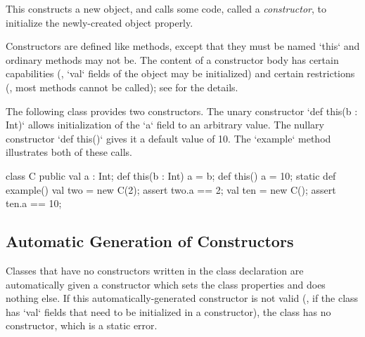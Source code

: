 This constructs a new object, and calls some code, called a {\em constructor},
to initialize the newly-created object properly.

Constructors are defined like methods, except that they must be named \xcd`this`
and ordinary methods may not be.    The content of a constructor body has
certain capabilities (\eg, \xcd`val` fields of the object may be initialized)
and certain restrictions (\eg, most methods cannot be called); see
 for the details.

\begin{ex}

The following class provides two constructors.  The unary constructor 
\xcd`def this(b : Int)` allows initialization of the \xcd`a` field to an 
arbitrary value.  The nullary constructor \xcd`def this()` gives it a default
value of 10.  The \xcd`example` method illustrates both of these calls.


\begin{xten}
class C {
  public val a : Int;
  def this(b : Int) { a = b; } 
  def this()        { a = 10; }
  static def example() {
     val two = new C(2);
     assert two.a == 2;
     val ten = new C(); 
     assert ten.a == 10;
  }
}
\end{xten}
\end{ex}


\subsection{Automatic Generation of Constructors}

Classes that have no constructors written in the class declaration are
automatically given a constructor which sets the class properties and does
nothing else. If this automatically-generated constructor is not valid (\eg,
if the class has \xcd`val` fields that need to be initialized in a
constructor), the class has no constructor, which is a static error.

